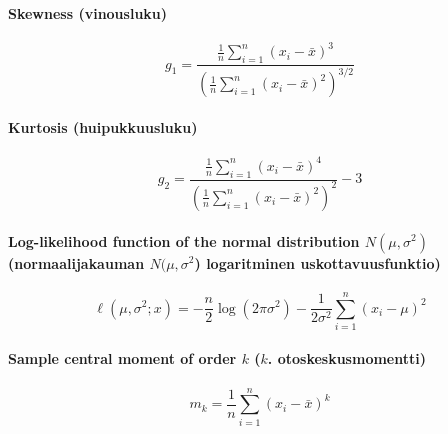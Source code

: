 \documentclass[12pt,a4]{article}
\begin{document}
\pagestyle{fancy}

\paragraph{Skewness (vinousluku)}
\[
    g_1 = \frac{\frac1n \sum_{i=1}^n (x_i - \bar x)^3}{\left(\frac1n \sum_{i=1}^n(x_i - \bar x)^2\right)^{3/2}}
\]
\paragraph{Kurtosis (huipukkuusluku)}
\[
    g_2 = \frac{\frac1n \sum_{i=1}^n (x_i - \bar x)^4}{\left(\frac1n \sum_{i=1}^n(x_i - \bar x)^2\right)^2} - 3
\]
\paragraph{Log-likelihood function of the normal distribution $N(\mu, \sigma^2)$ \\ (normaalijakauman $N(\mu, \sigma^2$) logaritminen uskottavuusfunktio)}
\[
    \ell(\mu, \sigma^2;x) = -\frac{n}2\log(2\pi\sigma^2) - \frac1{2\sigma^2}\sum_{i=1}^n (x_i-\mu)^2
\]
\paragraph{Sample central moment of order $k$ ($k$. otoskeskusmomentti)}
\[
    m_k = \frac1n \sum_{i=1}^n (x_i - \bar x)^k
\]
\end{document}
